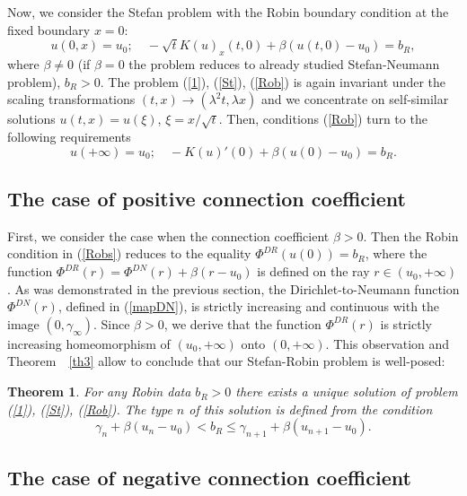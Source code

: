 \documentclass[10pt,a4paper]{amsart}
\newtheorem{theorem}{Theorem}[section]
\numberwithin{equation}{section}
\begin{document}
Now, we consider the Stefan problem with the Robin boundary condition at the fixed boundary $x=0$:
\begin{equation}\label{Rob}
u(0,x)=u_0; \quad -\sqrt{t}K(u)_x(t,0)+\beta(u(t,0)-u_0)=b_R,
\end{equation}
where $\beta\not=0$ (if $\beta=0$ the problem reduces to already studied Stefan-Neumann problem), $b_R>0$.
The problem (\ref{1}), (\ref{St}), (\ref{Rob}) is again invariant under the scaling transformations $(t,x)\to (\lambda^2 t,\lambda x)$ and we concentrate on self-similar solutions $u(t,x)=u(\xi)$, $\xi=x/\sqrt{t}$. Then, conditions (\ref{Rob})
turn to the following requirements
\begin{equation}\label{Robs}
u(+\infty)=u_0; \quad -K(u)'(0)+\beta(u(0)-u_0)=b_R.
\end{equation}

\subsection{The case of positive connection coefficient}\label{sec3pos}

First, we consider the case when the connection coefficient $\beta>0$. Then the Robin condition in (\ref{Robs}) reduces
to the equality $\Phi^{DR}(u(0))=b_R$, where the function $\Phi^{DR}(r)=\Phi^{DN}(r)+\beta(r-u_0)$ is defined on the ray
$r\in (u_0,+\infty)$. As was demonstrated in the previous section, the Dirichlet-to-Neumann function $\Phi^{DN}(r)$, defined in (\ref{mapDN}), is strictly increasing and continuous with the image $(0,\gamma_\infty)$. Since $\beta>0$, we derive that the function $\Phi^{DR}(r)$ is strictly increasing homeomorphism of $(u_0,+\infty)$ onto $(0,+\infty)$. This observation and Theorem~~\ref{th3} allow to conclude that our Stefan-Robin problem is well-posed:

\begin{theorem}\label{th6} For any Robin data $b_R>0$ there exists a unique solution of problem
(\ref{1}), (\ref{St}), (\ref{Rob}). The type $n$ of this solution is defined from the condition \[\gamma_n+\beta(u_n-u_0)<b_R\le\gamma_{n+1}+\beta(u_{n+1}-u_0).\]
\end{theorem}

\subsection{The case of negative connection coefficient}\label{sec3neg}
\end{document}
